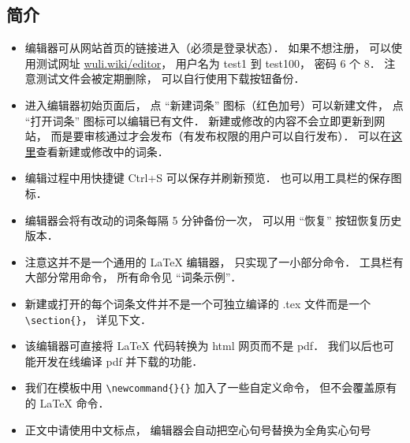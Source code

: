 
\subsection{简介}
\begin{itemize}
\item 编辑器可从网站首页的链接进入（必须是登录状态）． 如果不想注册， 可以使用测试网址 \href{http://wuli.wiki/editor}{wuli.wiki/editor}， 用户名为 test1 到 test100， 密码 6 个 8． 注意测试文件会被定期删除， 可以自行使用下载按钮备份．
\item 进入编辑器初始页面后， 点 “新建词条” 图标（红色加号）可以新建文件， 点 “打开词条” 图标可以编辑已有文件． 新建或修改的内容不会立即更新到网站， 而是要审核通过才会发布（有发布权限的用户可以自行发布）． 可以在\href{http://wuli.wiki/changed/changed.html}{这里}查看新建或修改中的词条．
\item 编辑过程中用快捷键 Ctrl+S 可以保存并刷新预览． 也可以用工具栏的保存图标．
\item 编辑器会将有改动的词条每隔 5 分钟备份一次， 可以用 “恢复” 按钮恢复历史版本．
\item 注意这并不是一个通用的 LaTeX 编辑器， 只实现了一小部分命令． 工具栏有大部分常用命令， 所有命令见 “词条示例”．
\item 新建或打开的每个词条文件并不是一个可独立编译的 .tex 文件而是一个 \lstinline|\section{}|， 详见下文．
\item 该编辑器可直接将 LaTeX 代码转换为 html 网页而不是 pdf． 我们以后也可能开发在线编译 pdf 并下载的功能．
\item 我们在模板中用 \lstinline|\newcommand{}{}| 加入了一些自定义命令， 但不会覆盖原有的 LaTeX 命令．
\item 正文中请使用中文标点， 编辑器会自动把空心句号替换为全角实心句号
\end{itemize}

